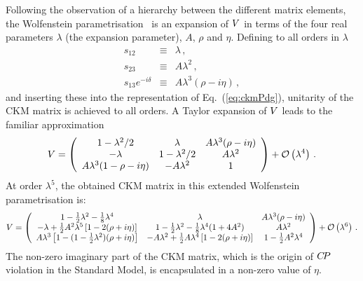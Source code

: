 Following the observation of a hierarchy between the different
matrix elements, the Wolfenstein parametrisation~\cite{Wolfenstein:1983yz}
is an expansion of ${V}$ in terms of the four real parameters $\lambda$
(the expansion parameter), $A$, $\rho$ and $\eta$. Defining to 
all orders in $\lambda$~\cite{Buras:1994ec}
\begin{eqnarray}
  \label{eq:burasdef}
  s_{12}             &\equiv& \lambda\,,\nonumber \\ 
  s_{23}             &\equiv& A\lambda^2\,, \\
  s_{13}e^{-i\delta} &\equiv& A\lambda^3(\rho -i\eta)\,,\nonumber
\end{eqnarray}
and inserting these into the representation of Eq.~(\ref{eq:ckmPdg}), 
unitarity of the CKM matrix is achieved to all orders.
A Taylor expansion of ${V}$ leads to the familiar approximation
\begin{equation}
  \label{eq:cp_uta:ckm}
  {V}
  = 
  \left(
    \begin{array}{ccc}
      1 - \lambda^2/2 & \lambda & A \lambda^3 ( \rho - i \eta ) \\
      - \lambda & 1 - \lambda^2/2 & A \lambda^2 \\
      A \lambda^3 ( 1 - \rho - i \eta ) & - A \lambda^2 & 1 \\
    \end{array}
  \right) + {\cal O}\left( \lambda^4 \right) \, .
\end{equation}
At order $\lambda^{5}$, the obtained CKM matrix in this extended
Wolfenstein parametrisation is:
{\small
  \begin{equation}
    \label{eq:cp_uta:ckm_lambda5}
    {V}
    =
    \left(
      \begin{array}{ccc}
        1 - \frac{1}{2}\lambda^{2} - \frac{1}{8}\lambda^4 &
        \lambda &
        A \lambda^{3} (\rho - i \eta) \\
        - \lambda + \frac{1}{2} A^2 \lambda^5 \left[ 1 - 2 (\rho + i \eta) \right] &
        1 - \frac{1}{2}\lambda^{2} - \frac{1}{8}\lambda^4 (1+4A^2) &
        A \lambda^{2} \\
        A \lambda^{3} \left[ 1 - (1-\frac{1}{2}\lambda^2)(\rho + i \eta) \right] &
        -A \lambda^{2} + \frac{1}{2}A\lambda^4 \left[ 1 - 2(\rho + i \eta) \right] &
        1 - \frac{1}{2}A^2 \lambda^4
      \end{array} 
    \right) + {\cal O}\left( \lambda^{6} \right)\,.
  \end{equation}
}
The non-zero imaginary part of the CKM matrix,
which is the origin of $C\!P$ violation in the Standard Model,
is encapsulated in a non-zero value of $\eta$.

